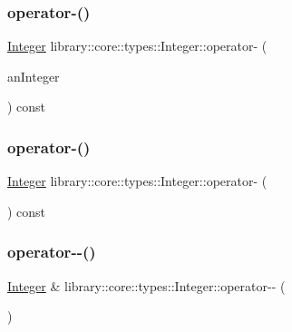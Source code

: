 \subsubsection{\texorpdfstring{operator-\/()}{operator-()}\hspace{0.1cm}{\footnotesize\ttfamily [2/3]}}
{\footnotesize\ttfamily \hyperlink{classlibrary_1_1core_1_1types_1_1_integer}{Integer} library\+::core\+::types\+::\+Integer\+::operator-\/ (\begin{DoxyParamCaption}\item[{const \hyperlink{classlibrary_1_1core_1_1types_1_1_integer_a623afb1580f870fd8a1997b1c12c917d}{Integer\+::\+Value\+Type} \&}]{an\+Integer }\end{DoxyParamCaption}) const}

\mbox{\label{classlibrary_1_1core_1_1types_1_1_integer_ad9670b50ae46bc0f09e4995e445dab99}} 
\subsubsection{\texorpdfstring{operator-\/()}{operator-()}\hspace{0.1cm}{\footnotesize\ttfamily [3/3]}}
{\footnotesize\ttfamily \hyperlink{classlibrary_1_1core_1_1types_1_1_integer}{Integer} library\+::core\+::types\+::\+Integer\+::operator-\/ (\begin{DoxyParamCaption}{ }\end{DoxyParamCaption}) const}

\mbox{\label{classlibrary_1_1core_1_1types_1_1_integer_aa57a45cc369f42e8a5f98391e26b6549}} 
\subsubsection{\texorpdfstring{operator-\/-\/()}{operator--()}\hspace{0.1cm}{\footnotesize\ttfamily [1/2]}}
{\footnotesize\ttfamily \hyperlink{classlibrary_1_1core_1_1types_1_1_integer}{Integer} \& library\+::core\+::types\+::\+Integer\+::operator-\/-\/ (\begin{DoxyParamCaption}{ }\end{DoxyParamCaption})}

